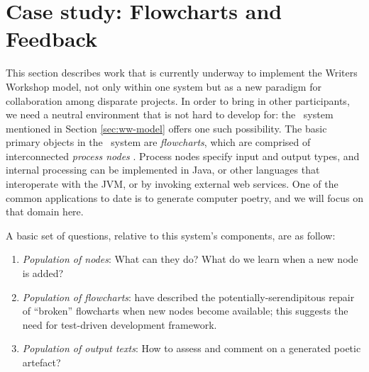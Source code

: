 \section{Case study: Flowcharts and Feedback} \label{sec:implementation}

This section describes work that is currently underway to implement the
Writers Workshop model, not only within one system but as a new paradigm
for collaboration among disparate projects.  In order to
bring in other participants, we need a neutral environment that is not
hard to develop for: the \Fw\ system mentioned in Section
\ref{sec:ww-model} offers one such possibility.  The basic primary
objects in the \Fw\ system are \emph{flowcharts}, which are comprised of
interconnected \emph{process nodes}
\cite{charnley2014flowr,colton-flowcharting}.  Process nodes specify
input and output types, and internal processing can be implemented in
Java, or other languages that interoperate with the JVM, or by
invoking external web services.  One of the common applications to
date is to generate computer poetry, and we will focus on that domain
here.

A basic set of questions, relative to this system's components, are as 
follow:
\begin{enumerate}
\item \emph{Population of nodes}: What can they do?  What do we learn
  when a new node is added?
\item \emph{Population of flowcharts}: 
  have described the potentially-serendipitous repair of ``broken''
  flowcharts when new nodes become available; this suggests the need for
  test-driven development framework.
\item \emph{Population of output texts}: How to assess and comment on
  a generated poetic artefact?
\end{enumerate}

